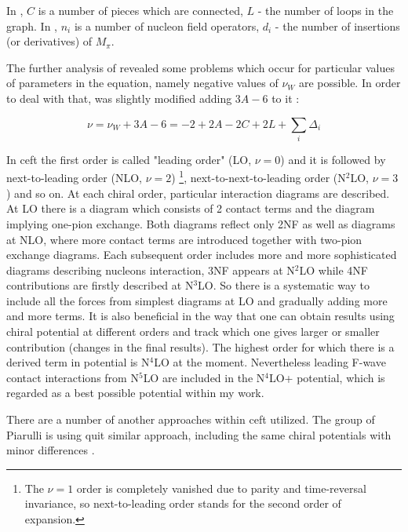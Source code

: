 In , $C$ is a number of pieces which are connected, $L$ - the number of loops in the graph.
In , $n_i$ is a number of nucleon field operators, $d_i$ - the number of insertions
(or derivatives) of  $M_\pi$.

The further analysis of  revealed some problems which occur 
for particular values of parameters in the equation, namely negative values of $\nu_W$ 
are possible.
In order to deal with that,  
was slightly modified adding $3A - 6$ to it  \cite{Machleidt2011, EPELBAUM2006_PROGRESS}:

\begin{equation}
    \nu = \nu_W + 3A  - 6 = -2 + 2A - 2C + 2L + \sum_i \Delta_i
    \label{powers_corrected}
\end{equation}


In \gls*{ceft} the first order is called "leading order" (LO, $\nu=0$)  and it is followed 
by next-to-leading order (NLO, $\nu=2$)
\footnote{The $\nu=1$ order is completely vanished due to parity and time-reversal invariance,
so next-to-leading order stands for the second order of expansion.},
 next-to-next-to-leading order (N$^2$LO, $\nu=3$) and so on.
 At each chiral order, particular interaction diagrams are described.
 At LO there is a diagram which consists of 2 contact terms and the diagram
 implying one-pion exchange. Both diagrams reflect only 2NF as well
 as diagrams at NLO, where more contact terms are introduced together with two-pion 
 exchange diagrams. Each subsequent order includes more and more sophisticated diagrams
 describing nucleons interaction,
 3NF appears at N$^2$LO while 4NF contributions are firstly described at N$^3$LO.
 So there is a systematic
way to include all the forces from simplest diagrams at LO and gradually
adding more and more terms. 
It is also beneficial in the way that 
one can obtain results using chiral potential at different
orders and track which one gives larger or smaller contribution (changes in the
final results).
The highest order for which there is a derived term in potential
is N$^4$LO at the moment. Nevertheless leading F-wave contact interactions from N$^5$LO are included in the N$^4$LO+ potential,
which is regarded as a best possible potential within my work. 

There are a number of another approaches within \gls*{ceft} utilized.
The group of Piarulli is using quit similar approach, including
the same chiral potentials with minor differences \cite{Piarulli2012,Piarulli2015}.

